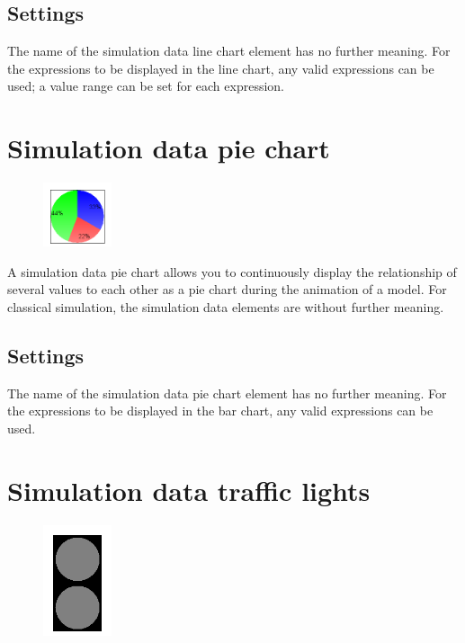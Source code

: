\subsection*{Settings}

The name of the simulation data line chart element has no further meaning.
For the expressions to be displayed in the line chart, any valid expressions can be used;
a value range can be set for each expression.


\section{Simulation data pie chart}
\label{ref:ModelElementAnimationPieChart}

\begin{figure}
\vspace{-22pt}
\includegraphics[width=2cm]{imageModelElementAnimationPieChart.png}
\vspace{-22pt}
\end{figure}

A simulation data pie chart allows you to continuously display the relationship
of several values to each other as a pie chart during the animation of a model.
For classical simulation, the simulation data elements are without further meaning.

\subsection*{Settings}

The name of the simulation data pie chart element has no further meaning.
For the expressions to be displayed in the bar chart, any valid expressions can be used.


\section{Simulation data traffic lights}
\label{ref:ModelElementAnimationTrafficLights}

\begin{figure}
\vspace{-22pt}
\includegraphics[width=2cm]{imageModelElementAnimationTrafficLights.png}
\vspace{-22pt}
\end{figure}

